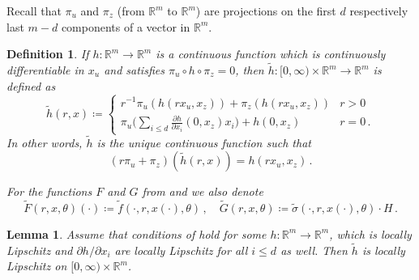 \documentclass[final]{amsart}
\newtheorem{deff}[thm]{Definition}
\newtheorem{lem}[thm]{Lemma}
\numberwithin{thm}{section}
\numberwithin{equation}{section}
\newcommand{\R}{\mathbb{R}}
\begin{document}
Recall that $\pi_u$ and $\pi_z$ (from $\R^m$ to $\R^m$) are projections on the first $d$ respectively last $m-d$ components of a vector in $\R^m$. 

\begin{deff}\label{r-functions}
    If $h: \R^m \to \R^m$ is a continuous function  which is continuously differentiable in $x_u$ and satisfies $\pi_u \circ h \circ \pi_z = 0$, then $\tilde h: [0,\infty) \times \R^m \to \R^m$ is defined as 
     $$\tilde h(r,x) \coloneqq \begin{cases}
        r^{-1}\pi_u(h(rx_u,x_z)) + \pi_z(h(rx_u,x_z))  & r > 0 \\
            \pi_u\big(\sum_{i \leq d}\frac{\partial h}{\partial x_i}(0,x_z)x_i\big) + h(0,x_z) & r = 0 \,.
        \end{cases}$$
    In other words, $\tilde h$ is the unique continuous function such that
    \begin{equation}\label{eq:alt-def-tilde}
        (r\pi_u + \pi_z)(\tilde h(r,x)) = h(rx_u,x_z) \,.
    \end{equation}
    
    

    For the functions $F$ and $G$ from  and 
     we also denote
    $$\tilde F(r,x,\theta)(\cdot) \coloneqq \tilde f(\cdot, r,x(\cdot),\theta) \,, \quad \tilde G(r,x,\theta) \coloneqq \tilde \sigma(\cdot, r,x(\cdot),\theta) \cdot H \,.$$
    
    
    
    
    
    
    
    
    
    
    
    
     
\end{deff}



\begin{lem}\label{lem:general-tilde-lipschitz}
Assume that conditions of  hold for some $h:\R^m \to \R^m$, which is  locally Lipschitz and $\partial h/\partial x_i$
are locally  Lipschitz for all $i \leq d$ as well. Then
$\tilde h$ is locally Lipschitz on $[0, \infty) \times \R^m$. 
\end{lem}
\end{document}
